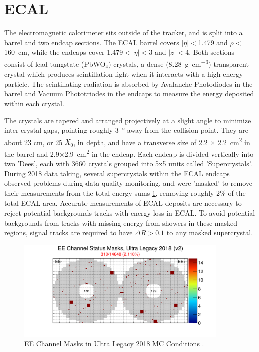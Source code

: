 \section{ECAL}
The electromagnetic calorimeter sits outside of the tracker, and is split into a barrel and two endcap sections. 
The ECAL barrel covers $\lvert\eta\rvert<$1.479 and $\rho<$\SI{160}{\centi\meter}, while the endcaps cover 1.479$<\lvert\eta\rvert<$3 and $\lvert z \rvert<4$. 
Both sections consist of lead tungstate (PbWO$_4$) crystals, a dense (\SI{8.28}{\gram\per\cubic\centi\meter}) transparent crystal which produces scintillation light when it interacts with a high-energy particle. 
The scintillating radiation is absorbed by Avalanche Photodiodes in the barrel and Vacuum Phototriodes in the endcaps to measure the energy deposited within each 
crystal. 

The crystals are tapered and arranged projectively at a slight angle to minimize inter-crystal gaps, pointing roughly \SI{3}{\degree} away from the collision point. 
They are about 23 cm, or 25 $X_0$, in depth, and have a transverse size of 2.2 $\times$ \SI{2.2}{\centi\meter^2} in the barrel and 2.9$\times$\SI{2.9}{\centi\meter^2} in the endcap. 
Each endcap is divided vertically into two 'Dees', each with 3660 crystals grouped into 5x5 units called 'Supercrystals'. 
During 2018 data taking, several supercrystals within the ECAL endcaps observed problems during data quality monitoring, and were 'masked' to remove their measurements from the total energy sums \cref{fig:EEmasks}, removing roughly 2$\%$ of the total ECAL area.
Accurate measurements of ECAL deposits are necessary to reject potential backgrounds tracks with energy loss in ECAL.
To avoid potential backgrounds from tracks with missing energy from showers in these masked regions, signal tracks are required to have $\Delta R>0.1$ to any masked supercrystal.

\begin{figure}[h]
    \includegraphics[width=0.9\textwidth]{figures/EEChannelMasks.png}
    \centering
    \caption{EE Channel Masks in Ultra Legacy 2018 MC Conditions \cite{EcalDPG}.}
    \label{fig:EEmasks}
\end{figure}

